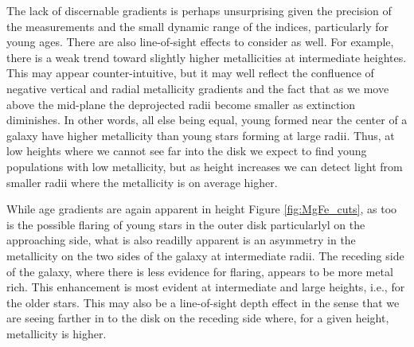 The lack of discernable gradients is perhaps unsurprising given the
precision of the measurements and the small dynamic range of the
indices, particularly for young ages. There are also line-of-sight
effects to consider as well. For example, there is a weak trend toward
slightly higher metallicities at intermediate heightes. This may
appear counter-intuitive, but it may well reflect the confluence of
negative vertical and radial metallicity gradients and the fact that
as we move above the mid-plane the deprojected radii become smaller as
extinction diminishes.  In other words, all else being equal, young
formed near the center of a galaxy have higher metallicity than
young stars forming at large radii. Thus, at low heights where we
cannot see far into the disk we expect to find young populations with
low metallicity, but as height increases we can detect light from
smaller radii where the metallicity is on average higher.

While age gradients are again apparent in height Figure
\ref{fig:MgFe_cuts}, as too is the possible flaring of young stars
in the outer disk particularlyl on the approaching side, what is
also readilly apparent is an asymmetry in the metallicity on the two
sides of the galaxy at intermediate radii. The receding side of the
galaxy, where there is less evidence for flaring, appears to be more
metal rich. This enhancement is most evident at intermediate and large
heights, i.e., for the older stars. This may also be a line-of-sight
depth effect in the sense that we are seeing farther in to the disk on
the receding side where, for a given height, metallicity is higher.

